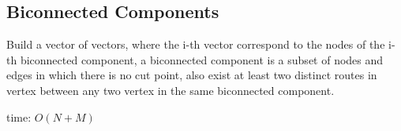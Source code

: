 \subsection{Biconnected Components}

Build a vector of vectors, where the i-th vector correspond to the nodes of the i-th biconnected component, a biconnected component is a subset of nodes and edges in which there is no cut point, also exist at least two distinct routes in vertex between any two vertex in the same biconnected component.

time: $O(N+M)$
